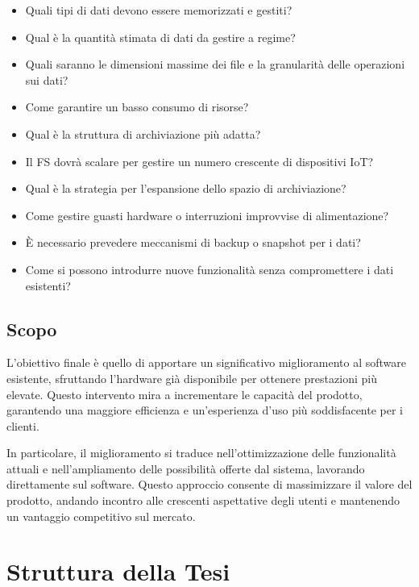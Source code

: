 \documentclass[12pt,a4paper,openright,twoside]{book}
\begin{document}
            \begin{itemize}
                \item Quali tipi di dati devono essere memorizzati e gestiti?
                \item Qual è la quantità stimata di dati da gestire a regime?
                \item Quali saranno le dimensioni massime dei file e la granularità delle operazioni sui dati?
                \item Come garantire un basso consumo di risorse?
                \item Qual è la struttura di archiviazione più adatta?
                \item Il \ac{FS} dovrà scalare per gestire un numero crescente di dispositivi IoT?
                \item Qual è la strategia per l'espansione dello spazio di archiviazione?
                \item Come gestire guasti hardware o interruzioni improvvise di alimentazione?
                \item È necessario prevedere meccanismi di backup o snapshot per i dati?
                \item Come si possono introdurre nuove funzionalità senza compromettere i dati esistenti?
            \end{itemize}

        \subsection{Scopo}

            L’obiettivo finale è quello di apportare un significativo miglioramento al software esistente, sfruttando l’hardware già disponibile per ottenere prestazioni più elevate. Questo intervento mira a incrementare le capacità del prodotto, garantendo una maggiore efficienza e un’esperienza d’uso più soddisfacente per i clienti.

            In particolare, il miglioramento si traduce nell’ottimizzazione delle funzionalità attuali e nell’ampliamento delle possibilità offerte dal sistema, lavorando direttamente sul software. Questo approccio consente di massimizzare il valore del prodotto, andando incontro alle crescenti aspettative degli utenti e mantenendo un vantaggio competitivo sul mercato.

    \section{Struttura della Tesi}
\end{document}
